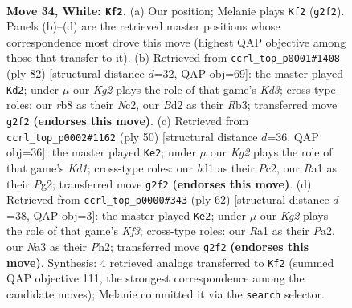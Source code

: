 \documentclass[11pt]{article}
\begin{document}
\clearpage

\begin{figure}[p]\centering
\begin{subfigure}{0.46\textwidth}\centering
\resizebox{\linewidth}{!}{%
\newchessgame
\chessboard[
  setfen={1r6/pp4k1/8/2p3r1/4p3/N3P3/PP1B2K1/R2b4 w - - 2 34},
  showmover=false,
  pgfstyle=straightmove, color=movearrow, markmove={g2-f2}
]}
\caption{}
\end{subfigure}\hfill
\begin{subfigure}{0.46\textwidth}\centering
\resizebox{\linewidth}{!}{%
\newchessgame
\chessboard[
  setfen={8/2k3p1/b3p2p/p1r1p3/B7/1R1K2P1/2N2P1P/8 w - - 1 42},
  showmover=false,
  pgfstyle=straightmove, color=movearrow, markmove={d3-d2}
]}
\caption{}
\end{subfigure}
\\[4pt]
\begin{subfigure}{0.46\textwidth}\centering
\resizebox{\linewidth}{!}{%
\newchessgame
\chessboard[
  setfen={8/2pr1k1p/p4p2/R7/8/2P1pP2/2P3PP/3K4 w - - 1 26},
  showmover=false,
  pgfstyle=straightmove, color=movearrow, markmove={d1-e2}
]}
\caption{}
\end{subfigure}\hfill
\begin{subfigure}{0.46\textwidth}\centering
\resizebox{\linewidth}{!}{%
\newchessgame
\chessboard[
  setfen={2r1k3/1Rb5/p2p2p1/3P1pP1/7p/5K2/P2B3P/8 w - - 10 32},
  showmover=false,
  pgfstyle=straightmove, color=movearrow, markmove={f3-e2}
]}
\caption{}
\end{subfigure}
\caption{\textbf{Move 34, White: \texttt{Kf2}.} (a) Our position; Melanie plays \texttt{Kf2} (\texttt{g2f2}). Panels (b)--(d) are the retrieved master positions whose correspondence most drove this move (highest QAP objective among those that transfer to it). (b) Retrieved from \texttt{ccrl\_top\_p0001\#1408} (ply 82) [structural distance $d$=32, QAP obj=69]: the master played \texttt{Kd2}; under $\mu$ our \emph{Kg2} plays the role of that game's \emph{Kd3}; cross-type roles: our \emph{r}b8 as their \emph{N}c2, our \emph{B}d2 as their \emph{R}b3; transferred move \texttt{g2f2} \textbf{(endorses this move)}. (c) Retrieved from \texttt{ccrl\_top\_p0002\#1162} (ply 50) [structural distance $d$=36, QAP obj=36]: the master played \texttt{Ke2}; under $\mu$ our \emph{Kg2} plays the role of that game's \emph{Kd1}; cross-type roles: our \emph{b}d1 as their \emph{P}c2, our \emph{R}a1 as their \emph{P}g2; transferred move \texttt{g2f2} \textbf{(endorses this move)}. (d) Retrieved from \texttt{ccrl\_top\_p0000\#343} (ply 62) [structural distance $d$=38, QAP obj=3]: the master played \texttt{Ke2}; under $\mu$ our \emph{Kg2} plays the role of that game's \emph{Kf3}; cross-type roles: our \emph{R}a1 as their \emph{P}a2, our \emph{N}a3 as their \emph{P}h2; transferred move \texttt{g2f2} \textbf{(endorses this move)}. Synthesis: 4 retrieved analogs transferred to \texttt{Kf2} (summed QAP objective 111, the strongest correspondence among the candidate moves); Melanie committed it via the \texttt{search} selector.}
\label{fig:thought-m66}
\end{figure}
\end{document}
